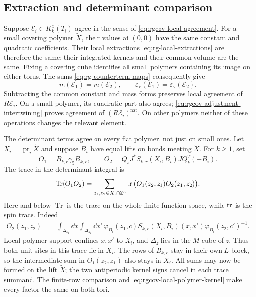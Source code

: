 \subsection{Extraction and determinant comparison}
\label{subsec:rgcov-determinants}

Suppose $\mathscr E_i\in K_k^x(T_i)$ agree in the sense
of \eqref{eq:rgcov-local-agreement}. For a small
covering polymer $\widetilde X$, their values at $(0,0)$
have the same constant and quadratic coefficients.
Their local extractions
\eqref{eq:rg-local-extractions} are therefore the same:
their integrated kernels and their common volume are
the same. Fixing a covering cube identifies all small
polymers containing its image on either torus. The sums
\eqref{eq:rg-counterterm-maps} consequently give
\begin{equation}\label{eq:rgcov-counterterms}
 m(\mathscr E_1)=m(\mathscr E_2),\qquad
 \varepsilon_{\mathrm v}(\mathscr E_1)
                         =\varepsilon_{\mathrm v}(\mathscr E_2).
\end{equation}
Subtracting the common constant and mass forms preserves
local agreement of $R\mathscr E_i$.
On a small polymer, its quadratic part also agrees;
\eqref{eq:rgcov-adjustment-intertwining} proves agreement
of $(R\mathscr E_i)^{\mathrm{nat}}$.
On other polymers neither of these operations changes
the relevant element.

The determinant terms agree on every flat polymer,
not just on small ones. Let $X_i=\operatorname{pr}_i
\widetilde X$ and suppose $B_i$ have equal lifts on
bonds meeting $\widetilde X$.
For $k\ge1$, set
\[
 O_1=B_{k,r}\gamma_5B_{k,r},\qquad
 O_2=Q_kJ^*S_{k,r}(X_i,B_i)JQ_k^T(-B_i).
\]
The trace in the determinant integral is
\begin{equation}\label{eq:rgcov-local-determinant-trace}
 \operatorname{Tr}(O_1O_2)
       =\sum_{z_1,z_2\in X_i\cap\mathbb Z^3}
                      \operatorname{tr}\big(O_1(z_2,z_1)O_2(z_1,z_2)\big).
\end{equation}
Here and below $\operatorname{Tr}$ is the trace on the whole finite
function space, while $\operatorname{tr}$ is the spin trace.
Indeed
\begin{align*}
 O_2(z_1,z_2)
   &=\int_{\Delta_{z_1}}\dd x\int_{\Delta_{z_2}}\dd x'\,
       \varphi_{B_i}(z_1,c)S_{k,r}(X_i,B_i)(x,x')
                            \varphi_{B_i}(z_2,c')^{-1}.
\end{align*}
Local polymer support confines $x,x'$ to $X_i$,
and $\Delta_z$ lies in the $M$-cube of $z$.
Thus both unit sites in this trace lie in $X_i$.
The rows of $B_{k,r}$ stay in their own $L$-block,
so the intermediate sum in $O_1(z_2,z_1)$ also stays
in $X_i$. All sums may now be formed on the lift
$\widetilde X$; the two antiperiodic kernel signs
cancel in each trace summand.
The finite-row comparison and
\eqref{eq:rgcov-local-polymer-kernel} make every factor
the same on both tori.

